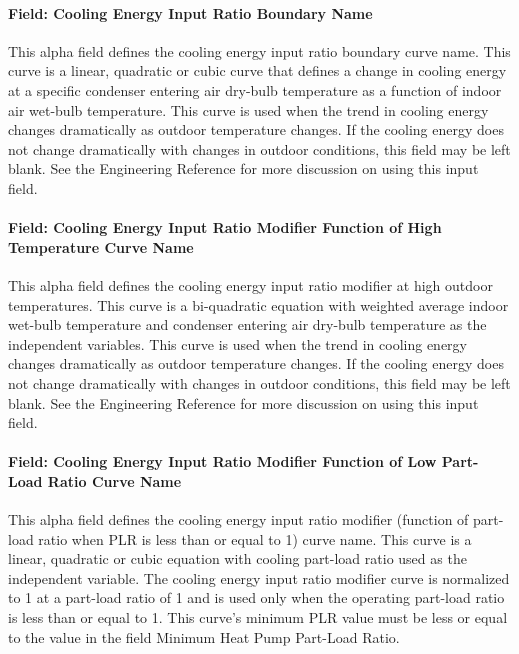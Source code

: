 \paragraph{Field: Cooling Energy Input Ratio Boundary Name}\label{field-cooling-energy-input-ratio-boundary-name}

This alpha field defines the cooling energy input ratio boundary curve name. This curve is a linear, quadratic or cubic curve that defines a change in cooling energy at a specific condenser entering air dry-bulb temperature as a function of indoor air wet-bulb temperature. This curve is used when the trend in cooling energy changes dramatically as outdoor temperature changes. If the cooling energy does not change dramatically with changes in outdoor conditions, this field may be left blank. See the Engineering Reference for more discussion on using this input field.

\paragraph{Field: Cooling Energy Input Ratio Modifier Function of High Temperature Curve Name}\label{field-cooling-energy-input-ratio-modifier-function-of-high-temperature-curve-name}

This alpha field defines the cooling energy input ratio modifier at high outdoor temperatures. This curve is a bi-quadratic equation with weighted average indoor wet-bulb temperature and condenser entering air dry-bulb temperature as the independent variables. This curve is used when the trend in cooling energy changes dramatically as outdoor temperature changes. If the cooling energy does not change dramatically with changes in outdoor conditions, this field may be left blank. See the Engineering Reference for more discussion on using this input field.

\paragraph{Field: Cooling Energy Input Ratio Modifier Function of Low Part-Load Ratio Curve Name}\label{field-cooling-energy-input-ratio-modifier-function-of-low-part-load-ratio-curve-name}

This alpha field defines the cooling energy input ratio modifier (function of part-load ratio when PLR is less than or equal to 1) curve name. This curve is a linear, quadratic or cubic equation with cooling part-load ratio used as the independent variable. The cooling energy input ratio modifier curve is normalized to 1 at a part-load ratio of 1 and is used only when the operating part-load ratio is less than or equal to 1. This curve's minimum PLR value must be less or equal to the value in the field Minimum Heat Pump Part-Load Ratio.

